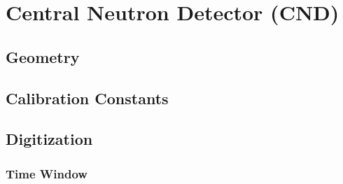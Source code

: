 \section{Central Neutron Detector (CND)}


\subsection{Geometry}

\subsection{Calibration Constants}


\subsection{Digitization}

\subsubsection{Time Window}

